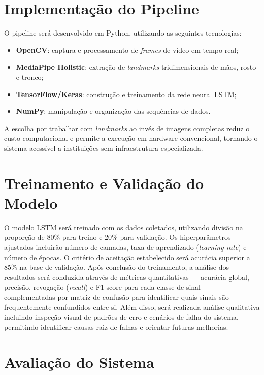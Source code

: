 \section{Implementação do Pipeline}

O pipeline será desenvolvido em Python, utilizando as seguintes tecnologias:

\begin{itemize}
    \item \textbf{OpenCV}: captura e processamento de \textit{frames} de vídeo em tempo real;
    \item \textbf{MediaPipe Holistic}: extração de \textit{landmarks} tridimensionais de mãos, rosto e tronco;
    \item \textbf{TensorFlow/Keras}: construção e treinamento da rede neural LSTM;
    \item \textbf{NumPy}: manipulação e organização das sequências de dados.
\end{itemize}

A escolha por trabalhar com \textit{landmarks} ao invés de imagens completas reduz o custo computacional e permite a execução em hardware convencional, tornando o sistema acessível a instituições sem infraestrutura especializada.

\section{Treinamento e Validação do Modelo}

O modelo LSTM será treinado com os dados coletados, utilizando divisão na proporção de 80\% para treino e 20\% para validação. Os hiperparâmetros ajustados incluirão número de camadas, taxa de aprendizado (\textit{learning rate}) e número de épocas. O critério de aceitação estabelecido será acurácia superior a 85\% na base de validação. Após conclusão do treinamento, a análise dos resultados será conduzida através de métricas quantitativas --- acurácia global, precisão, revogação (\textit{recall}) e F1-score para cada classe de sinal --- complementadas por matriz de confusão para identificar quais sinais são frequentemente confundidos entre si. Além disso, será realizada análise qualitativa incluindo inspeção visual de padrões de erro e cenários de falha do sistema, permitindo identificar causas-raiz de falhas e orientar futuras melhorias.

\section{Avaliação do Sistema}

